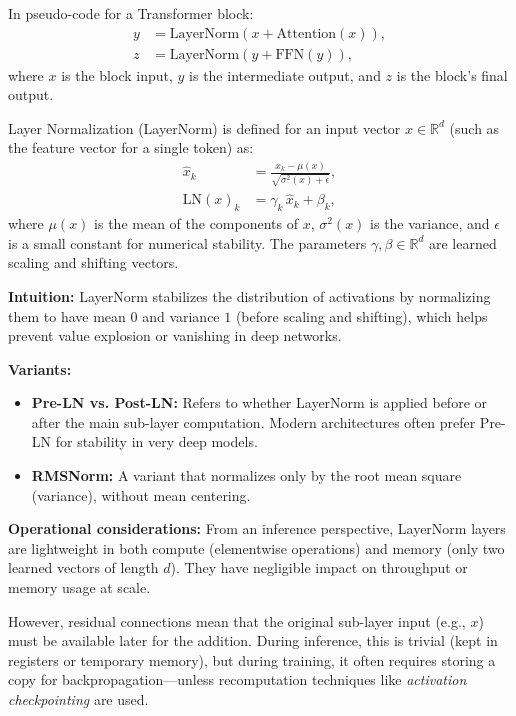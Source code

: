 In pseudo-code for a Transformer block:
\begin{align}
y &= \text{LayerNorm}\left( x + \text{Attention}(x) \right), \\
z &= \text{LayerNorm}\left( y + \text{FFN}(y) \right),
\end{align}
where $x$ is the block input, $y$ is the intermediate output, and $z$ is the block’s final output.  

Layer Normalization (LayerNorm) is defined for an input vector $x \in \mathbb{R}^d$ (such as the feature vector for a single token) as:
\begin{align}
\hat{x}_k &= \frac{x_k - \mu(x)}{\sqrt{\sigma^2(x) + \epsilon}}, \\
\text{LN}(x)_k &= \gamma_k \, \hat{x}_k + \beta_k,
\end{align}
where $\mu(x)$ is the mean of the components of $x$, $\sigma^2(x)$ is the variance, and $\epsilon$ is a small constant for numerical stability. The parameters $\gamma, \beta \in \mathbb{R}^d$ are learned scaling and shifting vectors.  

\noindent\textbf{Intuition:}  
LayerNorm stabilizes the distribution of activations by normalizing them to have mean $0$ and variance $1$ (before scaling and shifting), which helps prevent value explosion or vanishing in deep networks.  

\noindent\textbf{Variants:}  
\begin{itemize}
    \item \textbf{Pre-LN vs. Post-LN:} Refers to whether LayerNorm is applied before or after the main sub-layer computation. Modern architectures often prefer Pre-LN for stability in very deep models.
    \item \textbf{RMSNorm:} A variant that normalizes only by the root mean square (variance), without mean centering.
\end{itemize}

\noindent\textbf{Operational considerations:}  
From an inference perspective, LayerNorm layers are lightweight in both compute (elementwise operations) and memory (only two learned vectors of length $d$). They have negligible impact on throughput or memory usage at scale.  

However, residual connections mean that the original sub-layer input (e.g., $x$) must be available later for the addition. During inference, this is trivial (kept in registers or temporary memory), but during training, it often requires storing a copy for backpropagation—unless recomputation techniques like \emph{activation checkpointing} are used.  

